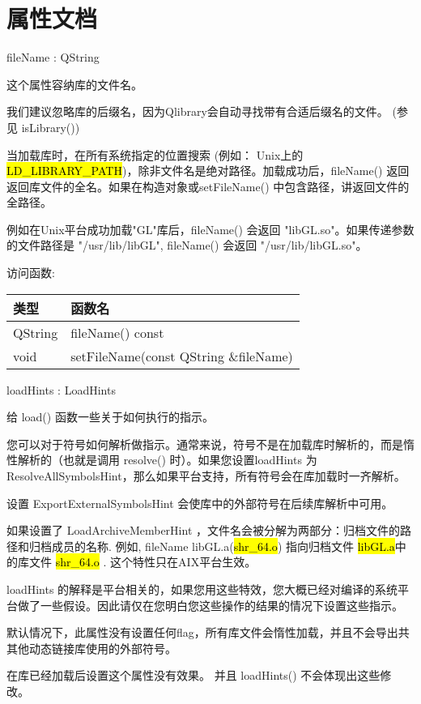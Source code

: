 \section{属性文档}

fileName : QString

这个属性容纳库的文件名。

我们建议忽略库的后缀名，因为Qlibrary会自动寻找带有合适后缀名的文件。 (参见 isLibrary())

当加载库时，在所有系统指定的位置搜索 (例如： Unix上的 \hl{LD\_LIBRARY\_PATH})，除非文件名是绝对路径。加载成功后，fileName() 返回返回库文件的全名。如果在构造对象或setFileName() 中包含路径，讲返回文件的全路径。

例如在Unix平台成功加载"GL"库后，fileName() 会返回 "libGL.so"。如果传递参数的文件路径是 "/usr/lib/libGL", fileName() 会返回 "/usr/lib/libGL.so"。

访问函数:

\begin{tabular}{|l|l|}
\hline
类型& 	函数名\\
\hline
QString& 	fileName() const\\
\hline
void& 	setFileName(const QString \&fileName)\\
\hline
\end{tabular}

loadHints : LoadHints

给 load() 函数一些关于如何执行的指示。

您可以对于符号如何解析做指示。通常来说，符号不是在加载库时解析的，而是惰性解析的（也就是调用 resolve() 时）。如果您设置loadHints 为ResolveAllSymbolsHint，那么如果平台支持，所有符号会在库加载时一齐解析。

设置 ExportExternalSymbolsHint 会使库中的外部符号在后续库解析中可用。

如果设置了 LoadArchiveMemberHint ，文件名会被分解为两部分：归档文件的路径和归档成员的名称. 例如, fileName libGL.a(\hl{shr\_64.o}) 指向归档文件 \hl{libGL.a}中的库文件 \hl{shr\_64.o} . 这个特性只在AIX平台生效。

loadHints 的解释是平台相关的，如果您用这些特效，您大概已经对编译的系统平台做了一些假设。因此请仅在您明白您这些操作的结果的情况下设置这些指示。

默认情况下，此属性没有设置任何flag，所有库文件会惰性加载，并且不会导出共其他动态链接库使用的外部符号。

\begin{notice}
在库已经加载后设置这个属性没有效果。 并且 loadHints() 不会体现出这些修
改。
\end{notice}

